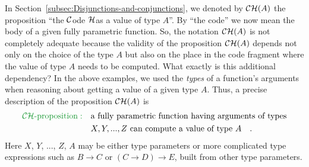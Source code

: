 In Section~\ref{subsec:Disjunctions-and-conjunctions}, we denoted
by ${\cal CH}(A)$ the proposition ``the ${\cal C}$ode ${\cal H}$as
a value of type $A$''. By ``the code'' we now mean the body of
a given fully parametric function. So, the notation ${\cal CH}(A)$
is not completely adequate because the validity of the proposition
${\cal CH}(A)$ depends not only on the choice of the type $A$ but
also on the place in the code fragment where the value of type $A$
needs to be computed. What exactly is this additional dependency?
In the above examples, we used the \emph{types} of a function's arguments
when reasoning about getting a value of a given type $A$. Thus, a
precise description of the proposition ${\cal CH}(A)$ is 
\begin{align}
{\color{greenunder}{\cal CH}\text{-proposition}:}\quad & \text{a fully parametric function having arguments of types}\nonumber \\
 & X,Y,...,Z\text{ can compute a value of type }A\quad.\label{eq:ch-CH-proposition-def}
\end{align}
Here $X$, $Y$, ..., $Z$, $A$ may be either type parameters or
more complicated type expressions such as $B\rightarrow C$ or $(C\rightarrow D)\rightarrow E$,
built from other type parameters.

